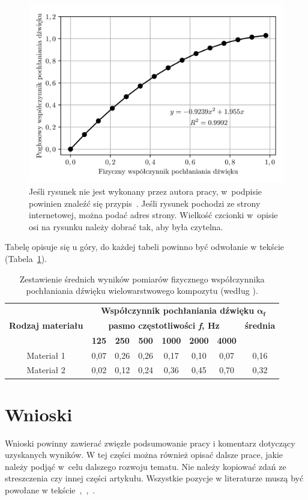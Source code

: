 \documentclass[12pt]{oska}
\begin{document}
\begin{figure}[H]
	\centering
	\includegraphics[width=\textwidth]{sample_rys1.png}
	\caption{Jeśli rysunek nie jest wykonany przez autora pracy, w~podpisie powinien znaleźć się przypis~\cite{bib2}. Jeśli rysunek pochodzi ze strony internetowej, można podać adres strony. Wielkość czcionki w~opisie osi na rysunku należy dobrać tak, aby była czytelna.}
	\label{rys1}
\end{figure}

Tabelę opisuje się u góry, do każdej tabeli powinno być odwołanie w tekście (Tabela~\ref{tab1}).

\begin{table}[H]
	\centering
	\caption{Zestawienie średnich wyników pomiarów fizycznego współczynnika pochłaniania dźwięku wielowarstwowego kompozytu (według \cite{bib2}).}
	\label{tab1}
	\begin{tabular}{|c|c|c|c|c|c|c|c|}
		\hline
		\multirow{3}{*}{\textbf{Rodzaj materiału}} & \multicolumn{7}{|c|}{\textbf{Współczynnik pochłaniania dźwięku} $\boldsymbol{\alpha_f}$} \\\cline{2-8}
		& \multicolumn{6}{|c|}{\textbf{pasmo częstotliwości \textit{f},
	    \si{\hertz}}} & \textbf{średnia}\\\cline{2-8}
		& \textbf{125} & \textbf{250} & \textbf{500} & \textbf{1000} & \textbf{2000} & \textbf{4000} &\\\hline
		Materiał 1 & 0,07 & 0,26 & 0,26 & 0,17 & 0,10 & 0,07 & 0,16 \\\hline
		Materiał 2 & 0,02 & 0,12 & 0,24 & 0,36 & 0,45 & 0,70 & 0,32 \\\hline
	\end{tabular}
\end{table}

\section{Wnioski}

Wnioski powinny zawierać zwięzłe podsumowanie pracy i komentarz dotyczący uzyskanych wyników. W tej części można również opisać dalsze prace, jakie należy podjąć w celu dalszego rozwoju tematu. Nie należy kopiować zdań ze streszczenia czy innej części artykułu. Wszystkie pozycje w literaturze muszą być powołane w tekście~\cite{bib3},~\cite{bib4},~\cite{bib5}. 

\printbibliography
\end{document}
